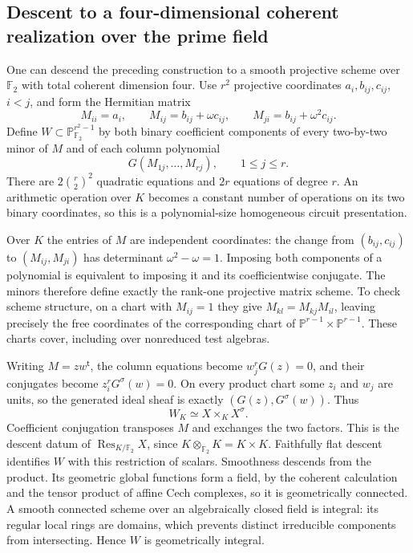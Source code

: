 \subsection{Descent to a four-dimensional coherent realization over the prime field}
One can descend the preceding construction to a smooth projective scheme over $\mathbb F_2$ with total coherent dimension four. Use $r^2$ projective coordinates $a_i,b_{ij},c_{ij}$, $i<j$, and form the Hermitian matrix
\[
 M_{ii}=a_i,\qquad M_{ij}=b_{ij}+\omega c_{ij},
 \qquad M_{ji}=b_{ij}+\omega^2c_{ij}.
\]
Define $W\subset\mathbb P^{r^2-1}_{\mathbb F_2}$ by both binary coefficient components of every two-by-two minor of $M$ and of each column polynomial
\[
 G(M_{1j},\ldots,M_{rj}),\qquad 1\leq j\leq r.
\]
There are $2\binom r2^2$ quadratic equations and $2r$ equations of degree $r$. An arithmetic operation over $K$ becomes a constant number of operations on its two binary coordinates, so this is a polynomial-size homogeneous circuit presentation.

Over $K$ the entries of $M$ are independent coordinates: the change from $(b_{ij},c_{ij})$ to $(M_{ij},M_{ji})$ has determinant $\omega^2-\omega=1$. Imposing both components of a polynomial is equivalent to imposing it and its coefficientwise conjugate. The minors therefore define exactly the rank-one projective matrix scheme. To check scheme structure, on a chart with $M_{ij}=1$ they give $M_{kl}=M_{kj}M_{il}$, leaving precisely the free coordinates of the corresponding chart of $\mathbb P^{r-1}\times\mathbb P^{r-1}$. These charts cover, including over nonreduced test algebras.

Writing $M=zw^{\mathsf t}$, the column equations become $w_j^rG(z)=0$, and their conjugates become $z_i^rG^\sigma(w)=0$. On every product chart some $z_i$ and $w_j$ are units, so the generated ideal sheaf is exactly $(G(z),G^\sigma(w))$. Thus
\[
 W_K\simeq X\times_K X^\sigma.
\]
Coefficient conjugation transposes $M$ and exchanges the two factors. This is the descent datum of $\operatorname{Res}_{K/\mathbb F_2}X$, since $K\otimes_{\mathbb F_2}K=K\times K$. Faithfully flat descent identifies $W$ with this restriction of scalars. Smoothness descends from the product. Its geometric global functions form a field, by the coherent calculation and the tensor product of affine Cech complexes, so it is geometrically connected. A smooth connected scheme over an algebraically closed field is integral: its regular local rings are domains, which prevents distinct irreducible components from intersecting. Hence $W$ is geometrically integral.

